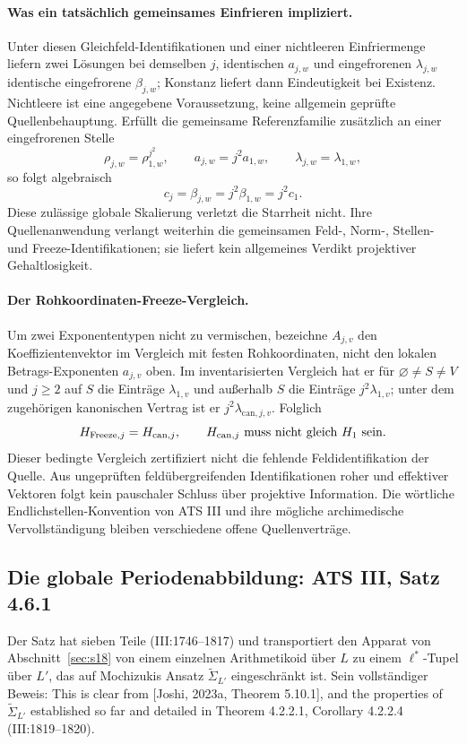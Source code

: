 \documentclass[11pt,a4paper]{article}
\theoremstyle{definition}
\theoremstyle{remark}
\begin{document}
\paragraph{Was ein tatsächlich gemeinsames Einfrieren impliziert.}
Unter diesen Gleichfeld-Identifi\-kationen und einer nichtleeren Einfrier\-menge
liefern zwei Lösungen bei demselben $j$, identischen $a_{j,w}$ und
eingefrorenen $\lambda_{j,w}$ identische eingefrorene $\beta_{j,w}$;
Konstanz liefert dann Eindeutigkeit bei Existenz. Nichtleere ist eine
angegebene Voraussetzung, keine allgemein geprüfte Quellenbehauptung.
Erfüllt die gemeinsame Referenzfamilie zusätzlich an einer eingefrorenen Stelle
\[
 \rho_{j,w}=\rho_{1,w}^{j^2},\qquad
 a_{j,w}=j^2 a_{1,w},\qquad \lambda_{j,w}=\lambda_{1,w},
\]
so folgt algebraisch
\[
 c_j=\beta_{j,w}=j^2\beta_{1,w}=j^2c_1.
\]
Diese zulässige globale Skalierung verletzt die Starrheit nicht. Ihre
Quellenanwendung verlangt weiterhin die gemeinsamen Feld-, Norm-,
Stellen- und Freeze-Identifikationen; sie liefert kein allgemeines Verdikt
projektiver Gehaltlosigkeit.

\paragraph{Der Rohkoordinaten-Freeze-Vergleich.}
Um zwei Exponententypen nicht zu vermischen, bezeichne $A_{j,v}$ den
Koeffizientenvektor im Vergleich mit festen Rohkoordinaten, nicht den
lokalen Betrags-Exponenten $a_{j,v}$ oben. Im inventarisierten Vergleich
hat er für $\varnothing\ne S\ne V$ und $j\ge2$ auf $S$ die Einträge
$\lambda_{1,v}$ und außerhalb $S$ die Einträge $j^2\lambda_{1,v}$;
unter dem zugehörigen kanonischen Vertrag ist er
$j^2\lambda_{\mathrm{can},j,v}$. Folglich
\[
 H_{\mathrm{Freeze},j}=H_{\mathrm{can},j},
 \qquad H_{\mathrm{can},j}\ \hbox{muss nicht gleich}\ H_1\ \hbox{sein}.
\]
Dieser bedingte Vergleich zertifiziert nicht die fehlende Feldidentifikation
der Quelle. Aus ungeprüften feldübergreifenden Identifikationen roher und
effektiver Vektoren folgt kein pauschaler Schluss über projektive
Information. Die wörtliche Endlichstellen-Konvention von ATS III und ihre
mögliche archimedische Vervollständigung bleiben verschiedene offene
Quellenverträge.

\subsection{Die globale Periodenabbildung: ATS III, Satz 4.6.1}\label{sec:s17}

Der Satz hat sieben Teile (III:1746--1817) und transportiert den Apparat von
Abschnitt~\ref{sec:s18} von einem einzelnen Arithmetikoid über $L$ zu einem
$\ell^*$-Tupel über $L'$, das auf Mochizukis Ansatz
$\widetilde{\Sigma}_{L'}$ eingeschränkt ist. Sein vollständiger Beweis:
\glqq This is clear from [Joshi, 2023a, Theorem 5.10.1], and the properties of
$\widetilde{\Sigma}_{L'}$ established so far and detailed in
Theorem 4.2.2.1, Corollary 4.2.2.4\grqq{} (III:1819--1820).
\end{document}
